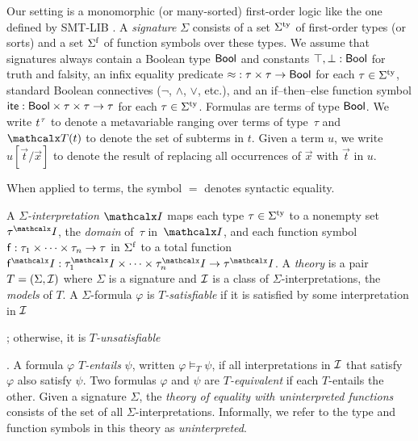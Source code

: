 Our setting is a monomorphic (or many-sorted) first-order logic
like the one defined by SMT-LIB \cite{smtlib25}.
A \emph{signature} $\Sigma$ consists of
a set $\stypes{\Sigma}$ of %
first-order types
%
(or sorts) and a set $\sfuns{\Sigma}$ of function symbols over these types.
We assume that signatures always contain a Boolean type $\mathsf{Bool}$ and constants
$\top, \bot : \mathsf{Bool}$ for truth and falsity,
an infix equality predicate ${\approx} : \tau \times \tau \to \mathsf{Bool}$
for each $\tau \in \stypes{\Sigma}$,
standard Boolean connectives ($\neg$, $\wedge$, $\vee$, etc.),
and an if--then--else function symbol
$\mathsf{ite} : \mathsf{Bool} \times \tau \times \tau \rightarrow \tau$
for each $\tau \in \stypes{\Sigma}$.
Formulas are terms of type $\mathsf{Bool}$.
We write $t\typ{\tau}$ to denote a metavariable ranging over terms of
type~$\tau$ and $\terms( t )$ to denote the set of subterms in $t$.
Given a term $u$, we write $u[\vec t/\vec x]$ to denote the result of replacing
all occurrences of $\vec x$ with $\vec t$ in $u$.
\begin{longv}When applied to terms, the symbol $=$ denotes syntactic equality.\end{longv}


A \emph{$\Sigma$-interpretation $\I$} %
maps each type $\tau \in \stypes{\Sigma}$ to a nonempty set $\tau^\I$,
the \emph{domain} of~$\tau$ in~$\I$,
and each function symbol $\mathsf{f} : \tau_1 \times \cdots \times \tau_n \rightarrow \tau$ in
$\sfuns{\Sigma}$
to a total function $\con{f}^\I : \tau_1^\I \times \cdots \times \tau_n^\I \rightarrow \tau^\I$.
A \emph{theory} is a pair $T = (\Sigma, \Mo)$ where
$\Sigma$ is a signature and ${\mathcal{I}}$ is a class of $\Sigma$-interpretations,
the \emph{models} of $T$.
A $\Sigma$-formula $\varphi$ is
\emph{$T$-satisfiable}
if it is satisfied by some interpretation in ${\mathcal{I}}$\begin{longv};
otherwise, it is \emph{$T$-unsatisfiable}\end{longv}.
A formula $\varphi$ \emph{$T$-entails} $\psi$, written $\varphi \models_T \psi$,
if all interpretations in ${\mathcal{I}}$ that satisfy $\varphi$ also satisfy $\psi$.
Two formulas $\varphi$ and $\psi$ are \emph{$T$-equivalent} 
if each $T$-entails the other.
Given a signature $\Sigma$,
the \emph{theory of equality with uninterpreted functions} \euf
consists of the set of all $\Sigma$-interpretations.
Informally, we refer to the type and function symbols in this theory as \emph{uninterpreted}.

